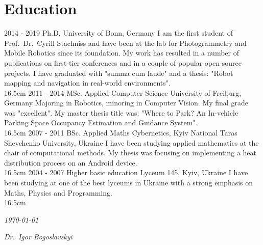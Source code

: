 \documentclass[]{friggeri-cv}
\begin{document}
{\section{Education}
\begin{entrylist}
  \entrywide
    {2014 - 2019}
    {Ph.D.}
    {University of Bonn, Germany}
    {I am the first student of Prof.~Dr.~Cyrill Stachniss and have been at the lab for Photogrammetry and Mobile Robotics since its foundation. My work has resulted in a number of publications on first-tier conferences and in a couple of popular open-source projects. I have graduated with "summa cum laude" and a thesis: "Robot mapping and navigation in real-world environments".\\}
    {16.5cm}
  \entrywide
    {2011 - 2014}
    {MSc. Applied Computer Science}
    {University of Freiburg, Germany}
    {Majoring in Robotics, minoring in Computer Vision. My final grade was "excellent". My master thesis title was: "Where to Park? An In-vehicle Parking Space Occupancy Estimation and Guidance System".\\}
    {16.5cm}
  \entrywide
    {2007 - 2011}
    {BSc. Applied Maths}
    {Cybernetics,  Kyiv National Taras Shevchenko University, Ukraine}
    {I have been studying applied mathematics at the chair of computational methods. My thesis was focusing on implementing a heat distribution process on an Android device.\\}
    {16.5cm}
  \entrywide
    {2004 - 2007}
    {Higher basic education}
    {Lyceum 145, Kyiv, Ukraine}
    {I have been studying at one of the best lyceums in Ukraine with a strong emphasis on Maths, Physics and Programming.\\}
    {16.5cm}
\end{entrylist}

\begin{flushleft}
\emph{\today}
\end{flushleft}
\vspace{-8mm}
\begin{flushright}
\emph{Dr.~Igor Bogoslavskyi}
\end{flushright}

\clearpage
\restoregeometry
}
\end{document}
